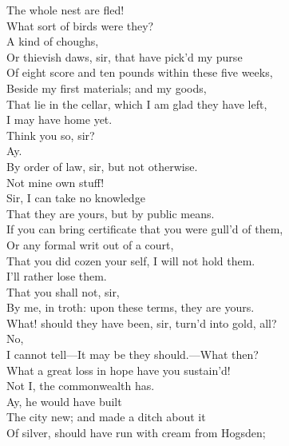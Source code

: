 \documentclass[a4paper,oneside]{memoir}
\begin{document}
\begin{drama*}
\mammonspeaks {} The whole nest are fled!\\
\lovewitspeaks What sort of birds were they?\\
\mammonspeaks {} A kind of choughs,\\
Or thievish daws, sir, that have pick'd my purse\\
Of eight score and ten pounds within these five weeks,\\
Beside my first materials; and my goods,\\
That lie in the cellar, which I am glad they have left,\\
I may have home yet.\\
\lovewitspeaks {} Think you so, sir?\\
\mammonspeaks {} Ay.\\
\lovewitspeaks By order of law, sir, but not otherwise.\\
\mammonspeaks Not mine own stuff!\\
\lovewitspeaks {} Sir, I can take no knowledge\\
That they are yours, but by public means.\\
If you can bring certificate that you were gull'd of them,\\
Or any formal writ out of a court,\\
That you did cozen your self, I will not hold them.\\
\mammonspeaks I'll rather lose them.\\
\lovewitspeaks {} That you shall not, sir,\\
By me, in troth: upon these terms, they are yours.\\
What! should they have been, sir, turn'd into gold, all?\\
\mammonspeaks No,\\
I cannot tell---It may be they should.---What then?\\
\lovewitspeaks What a great loss in hope have you sustain'd!\\
\mammonspeaks Not I, the commonwealth has.\\
\facespeaks {} Ay, he would have built\\
The city new; and made a ditch about it\\
Of silver, should have run with cream from Hogsden;\\

\end{drama*}
\end{document}
